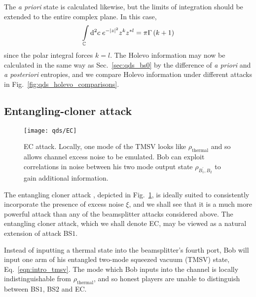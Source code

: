 The \emph{a priori} state is calculated likewise, but the limits of integration should be extended to the entire complex plane. In this case,
\begin{equation}\label{eqn:qds_bs1_deriv_4}
\int\limits_{\mathbb{C}} \mathop{}\!\mathrm{d^2} c \; e^{-\left|z\right|^2}z^k z^{* l} = \pi \Gamma\left(k+1\right)
\end{equation}
since the polar integral forces $k=l$. The Holevo information may now be calculated in the same way as Sec.~\ref{sec:qds_bs0} by the difference of \emph{a priori} and \emph{a posteriori} entropies, and we compare Holevo information under different attacks in Fig.~\ref{fig:qds_holevo_comparisons}.



\subsection{Entangling-cloner attack}\label{sec:qds_ec}
\begin{figure}[htp]
\captionsetup{width=0.8\linewidth}
\centering
\texttt{[image: qds/EC]}
\caption{\label{fig:ec_attack} EC attack. Locally, one mode of the TMSV looks like $\rho_{\text{thermal}}$ and so allows channel excess noise to be emulated. Bob can exploit correlations in noise between his two mode output state $\rho_{B_1^\prime, B_2}$ to gain additional information.}
\end{figure}
The entangling cloner attack \cite{Grosshans2002, Grosshans2003}, depicted in Fig.~\ref{fig:ec_attack}, is ideally suited to consistently incorporate the presence of excess noise $\xi$, and we shall see that it is a much more powerful attack than any of the beamsplitter attacks considered above. The entangling cloner attack, which we shall denote EC, may be viewed as a natural extension of attack BS$1$.  %

Instead of inputting a thermal state into the beamsplitter's fourth port, Bob will input one arm of his entangled two-mode squeezed vacuum (TMSV) state, Eq.~\ref{eqn:intro_tmsv}. The mode which Bob inputs into the channel is locally indistinguishable from $\rho_{\text{thermal}}$, and so honest players are unable to distinguish between BS$1$, BS$2$ and EC.


